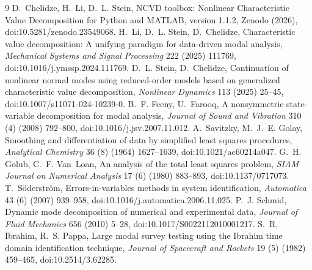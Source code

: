 \documentclass[report]{nld}
\theoremstyle{remark}\newtheorem*{remark}{Remark}
\begin{document}
\begin{thebibliography}{9}\small
{} D.~Chelidze, H.~Li, D.~L. Stein, NCVD toolbox: Nonlinear
  Characteristic Value Decomposition for Python and MATLAB, version 1.1.2,
  Zenodo (2026), doi:10.5281/zenodo.23549068.
 H.~Li, D.~L. Stein, D.~Chelidze, Characteristic value
  decomposition: A unifying paradigm for data-driven modal analysis,
  \emph{Mechanical Systems and Signal Processing} 222 (2025) 111769,
  doi:10.1016/j.ymssp.2024.111769.
 D.~L. Stein, D.~Chelidze, Continuation of nonlinear normal
  modes using reduced-order models based on generalized characteristic value
  decomposition, \emph{Nonlinear Dynamics} 113 (2025) 25--45,
  doi:10.1007/s11071-024-10239-0.
 B.~F. Feeny, U.~Farooq, A nonsymmetric state-variable
  decomposition for modal analysis, \emph{Journal of Sound and Vibration} 310 (4)
  (2008) 792--800, doi:10.1016/j.jsv.2007.11.012.
 A.~Savitzky, M.~J.~E. Golay, Smoothing and
  differentiation of data by simplified least squares procedures,
  \emph{Analytical Chemistry} 36 (8) (1964) 1627--1639, doi:10.1021/ac60214a047.
 G.~H. Golub, C.~F. Van~Loan, An analysis of the total least
  squares problem, \emph{SIAM Journal on Numerical Analysis} 17 (6) (1980)
  883--893, doi:10.1137/0717073.
 T.~S\"oderstr\"om, Errors-in-variables methods in
  system identification, \emph{Automatica} 43 (6) (2007) 939--958,
  doi:10.1016/j.automatica.2006.11.025.
 P.~J. Schmid, Dynamic mode decomposition of numerical and
  experimental data, \emph{Journal of Fluid Mechanics} 656 (2010) 5--28,
  doi:10.1017/S0022112010001217.
 S.~R. Ibrahim, R.~S. Pappa, Large modal survey testing
  using the Ibrahim time domain identification technique, \emph{Journal of
  Spacecraft and Rockets} 19 (5) (1982) 459--465, doi:10.2514/3.62285.
\end{thebibliography}
\end{document}
